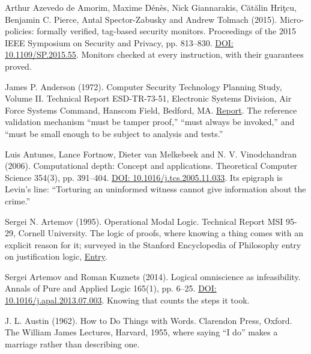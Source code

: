 \noindent Arthur Azevedo de Amorim, Maxime D\'en\`es, Nick Giannarakis, C\u{a}t\u{a}lin Hri\c{t}cu, Benjamin C. Pierce, Antal Spector-Zabusky and Andrew Tolmach (2015). Micro-policies: formally verified, tag-based security monitors. Proceedings of the 2015 IEEE Symposium on Security and Privacy, pp. 813--830. \href{https://doi.org/10.1109/SP.2015.55}{DOI: 10.1109/SP.2015.55}. Monitors checked at every instruction, with their guarantees proved.
\par\medskip

\noindent James P. Anderson (1972). Computer Security Technology Planning Study, Volume II. Technical Report ESD-TR-73-51, Electronic Systems Division, Air Force Systems Command, Hanscom Field, Bedford, MA. \href{https://csrc.nist.gov/csrc/media/publications/conference-paper/1998/10/08/proceedings-of-the-21st-nissc-1998/documents/early-cs-papers/ande72.pdf}{Report}. The reference validation mechanism ``must be tamper proof,'' ``must always be invoked,'' and ``must be small enough to be subject to analysis and tests.''
\par\medskip

\noindent Luis Antunes, Lance Fortnow, Dieter van Melkebeek and N. V. Vinodchandran (2006). Computational depth: Concept and applications. Theoretical Computer Science 354(3), pp. 391--404. \href{https://doi.org/10.1016/j.tcs.2005.11.033}{DOI: 10.1016/j.tcs.2005.11.033}. Its epigraph is Levin's line: ``Torturing an uninformed witness cannot give information about the crime.''
\par\medskip

\noindent Sergei N. Artemov (1995). Operational Modal Logic. Technical Report MSI 95-29, Cornell University. The logic of proofs, where knowing a thing comes with an explicit reason for it; surveyed in the Stanford Encyclopedia of Philosophy entry on justification logic, \href{https://plato.stanford.edu/entries/logic-justification/}{Entry}.
\par\medskip

\noindent Sergei Artemov and Roman Kuznets (2014). Logical omniscience as infeasibility. Annals of Pure and Applied Logic 165(1), pp. 6--25. \href{https://doi.org/10.1016/j.apal.2013.07.003}{DOI: 10.1016/j.apal.2013.07.003}. Knowing that counts the steps it took.
\par\medskip

\noindent J. L. Austin (1962). How to Do Things with Words. Clarendon Press, Oxford. The William James Lectures, Harvard, 1955, where saying ``I do'' makes a marriage rather than describing one.
\par\medskip

